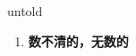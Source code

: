 
\begin{frame}
{\huge untold}
\begin{center}
\begin{enumerate}\Large
  \item \textbf{数不清的，无数的}
\end{enumerate}
\end{center}
\end{frame}
